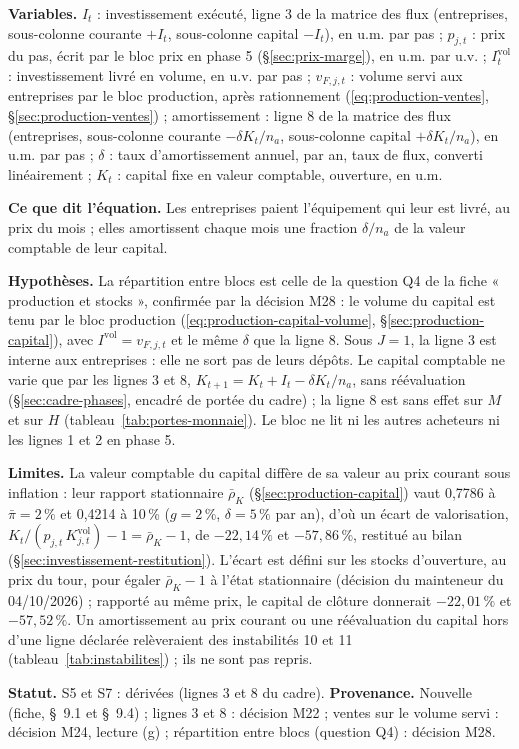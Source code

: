 \documentclass[11pt,a4paper]{article}
\newcommand{\variables}{\par\noindent\textbf{Variables.} }
\newcommand{\sens}{\par\noindent\textbf{Ce que dit l'équation.} }
\newcommand{\hyp}{\par\noindent\textbf{Hypothèses.} }
\newcommand{\limites}{\par\noindent\textbf{Limites.} }
\begin{document}
\begin{proposee}
\variables $I_t$ : investissement exécuté, ligne 3 de la matrice des flux (entreprises, sous-colonne courante $+I_t$, sous-colonne capital $-I_t$), en u.m. par pas ; $p_{j,t}$ : prix du pas, écrit par le bloc prix en phase 5 (\S\ref{sec:prix-marge}), en u.m. par u.v. ; $I^{\mathrm{vol}}_t$ : investissement livré en volume, en u.v. par pas ; $v_{F,j,t}$ : volume servi aux entreprises par le bloc production, après rationnement (\eqref{eq:production-ventes}, \S\ref{sec:production-ventes}) ; amortissement : ligne 8 de la matrice des flux (entreprises, sous-colonne courante $-\delta K_t/n_a$, sous-colonne capital $+\delta K_t/n_a$), en u.m. par pas ; $\delta$ : taux d'amortissement annuel, par an, taux de flux, converti linéairement ; $K_t$ : capital fixe en valeur comptable, ouverture, en u.m.
\sens Les entreprises paient l'équipement qui leur est livré, au prix du mois ; elles amortissent chaque mois une fraction $\delta/n_a$ de la valeur comptable de leur capital.
\hyp La répartition entre blocs est celle de la question Q4 de la fiche « production et stocks », confirmée par la décision M28 : le volume du capital est tenu par le bloc production (\eqref{eq:production-capital-volume}, \S\ref{sec:production-capital}), avec $I^{\mathrm{vol}} = v_{F,j,t}$ et le même $\delta$ que la ligne 8. Sous $J = 1$, la ligne 3 est interne aux entreprises : elle ne sort pas de leurs dépôts. Le capital comptable ne varie que par les lignes 3 et 8, $K_{t+1} = K_t + I_t - \delta K_t/n_a$, sans réévaluation (\S\ref{sec:cadre-phases}, encadré de portée du cadre) ; la ligne 8 est sans effet sur $M$ et sur $H$ (tableau~\ref{tab:portes-monnaie}). Le bloc ne lit ni les autres acheteurs ni les lignes 1 et 2 en phase 5.
\limites La valeur comptable du capital diffère de sa valeur au prix courant sous inflation : leur rapport stationnaire $\bar\rho_K$ (\S\ref{sec:production-capital}) vaut 0,7786 à $\bar\pi = 2\,\%$ et 0,4214 à 10\,\% ($g = 2\,\%$, $\delta = 5\,\%$ par an), d'où un écart de valorisation, $K_t/(p_{j,t}\,K^{\mathrm{vol}}_{j,t}) - 1 = \bar\rho_K - 1$, de $-22{,}14\,\%$ et $-57{,}86\,\%$, restitué au bilan (\S\ref{sec:investissement-restitution}). L'écart est défini sur les stocks d'ouverture, au prix du tour, pour égaler $\bar\rho_K - 1$ à l'état stationnaire (décision du mainteneur du 04/10/2026) ; rapporté au même prix, le capital de clôture donnerait $-22{,}01\,\%$ et $-57{,}52\,\%$. Un amortissement au prix courant ou une réévaluation du capital hors d'une ligne déclarée relèveraient des instabilités 10 et 11 (tableau~\ref{tab:instabilites}) ; ils ne sont pas repris.

\textbf{Statut.} S5 et S7 : dérivées (lignes 3 et 8 du cadre). \textbf{Provenance.} Nouvelle (fiche, \S~9.1 et \S~9.4) ; lignes 3 et 8 : décision M22 ; ventes sur le volume servi : décision M24, lecture (g) ; répartition entre blocs (question Q4) : décision M28.
\end{proposee}
\end{document}
